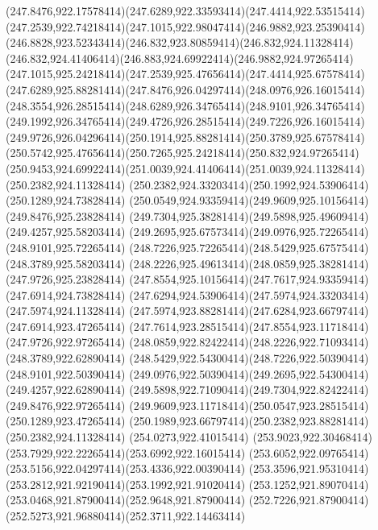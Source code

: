 {{	\curveto(247.8476,922.17578414)(247.6289,922.33593414)(247.4414,922.53515414)
	\curveto(247.2539,922.74218414)(247.1015,922.98047414)(246.9882,923.25390414)
	\curveto(246.8828,923.52343414)(246.832,923.80859414)(246.832,924.11328414)
	\curveto(246.832,924.41406414)(246.883,924.69922414)(246.9882,924.97265414)
	\curveto(247.1015,925.24218414)(247.2539,925.47656414)(247.4414,925.67578414)
	\curveto(247.6289,925.88281414)(247.8476,926.04297414)(248.0976,926.16015414)
	\curveto(248.3554,926.28515414)(248.6289,926.34765414)(248.9101,926.34765414)
	\curveto(249.1992,926.34765414)(249.4726,926.28515414)(249.7226,926.16015414)
	\curveto(249.9726,926.04296414)(250.1914,925.88281414)(250.3789,925.67578414)
	\curveto(250.5742,925.47656414)(250.7265,925.24218414)(250.832,924.97265414)
	\curveto(250.9453,924.69922414)(251.0039,924.41406414)(251.0039,924.11328414)
	\closepath
	\moveto(250.2382,924.11328414)
	\curveto(250.2382,924.33203414)(250.1992,924.53906414)(250.1289,924.73828414)
	\curveto(250.0549,924.93359414)(249.9609,925.10156414)(249.8476,925.23828414)
	\curveto(249.7304,925.38281414)(249.5898,925.49609414)(249.4257,925.58203414)
	\curveto(249.2695,925.67573414)(249.0976,925.72265414)(248.9101,925.72265414)
	\curveto(248.7226,925.72265414)(248.5429,925.67575414)(248.3789,925.58203414)
	\curveto(248.2226,925.49613414)(248.0859,925.38281414)(247.9726,925.23828414)
	\curveto(247.8554,925.10156414)(247.7617,924.93359414)(247.6914,924.73828414)
	\curveto(247.6294,924.53906414)(247.5974,924.33203414)(247.5974,924.11328414)
	\curveto(247.5974,923.88281414)(247.6284,923.66797414)(247.6914,923.47265414)
	\curveto(247.7614,923.28515414)(247.8554,923.11718414)(247.9726,922.97265414)
	\curveto(248.0859,922.82422414)(248.2226,922.71093414)(248.3789,922.62890414)
	\curveto(248.5429,922.54300414)(248.7226,922.50390414)(248.9101,922.50390414)
	\curveto(249.0976,922.50390414)(249.2695,922.54300414)(249.4257,922.62890414)
	\curveto(249.5898,922.71090414)(249.7304,922.82422414)(249.8476,922.97265414)
	\curveto(249.9609,923.11718414)(250.0547,923.28515414)(250.1289,923.47265414)
	\curveto(250.1989,923.66797414)(250.2382,923.88281414)(250.2382,924.11328414)
	\closepath
	\moveto(254.0273,922.41015414)
	\curveto(253.9023,922.30468414)(253.7929,922.22265414)(253.6992,922.16015414)
	\curveto(253.6052,922.09765414)(253.5156,922.04297414)(253.4336,922.00390414)
	\curveto(253.3596,921.95310414)(253.2812,921.92190414)(253.1992,921.91020414)
	\curveto(253.1252,921.89070414)(253.0468,921.87900414)(252.9648,921.87900414)
	\curveto(252.7226,921.87900414)(252.5273,921.96880414)(252.3711,922.14463414)
}}
